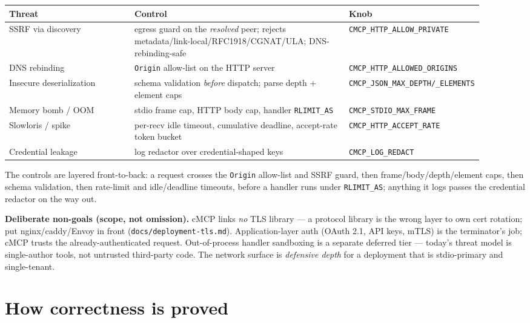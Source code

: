 \documentclass[10pt]{article}
\newcommand{\code}[1]{\texttt{\small #1}}
\begin{document}
\begin{center}\small
\begin{tabular}{p{0.27\linewidth} p{0.46\linewidth} p{0.18\linewidth}}
\toprule
Threat & Control & Knob \\
\midrule
SSRF via discovery & egress guard on the \emph{resolved} peer; rejects
  metadata/link-local/RFC1918/CGNAT/ULA; DNS-rebinding-safe & \code{CMCP\_HTTP\_ALLOW\_PRIVATE} \\
DNS rebinding & \code{Origin} allow-list on the HTTP server & \code{CMCP\_HTTP\_ALLOWED\_ORIGINS} \\
Insecure deserialization & schema validation \emph{before} dispatch; parse depth + element caps & \code{CMCP\_JSON\_MAX\_DEPTH/\_ELEMENTS} \\
Memory bomb / OOM & stdio frame cap, HTTP body cap, handler \code{RLIMIT\_AS} & \code{CMCP\_STDIO\_MAX\_FRAME} \\
Slowloris / spike & per-recv idle timeout, cumulative deadline, accept-rate token bucket & \code{CMCP\_HTTP\_ACCEPT\_RATE} \\
Credential leakage & log redactor over credential-shaped keys & \code{CMCP\_LOG\_REDACT} \\
\bottomrule
\end{tabular}
\end{center}

The controls are layered front-to-back: a request crosses the \code{Origin}
allow-list and SSRF guard, then frame/body/depth/element caps, then schema
validation, then rate-limit and idle/deadline timeouts, before a handler runs
under \code{RLIMIT\_AS}; anything it logs passes the credential redactor on the
way out.

\textbf{Deliberate non-goals (scope, not omission).} cMCP links \emph{no} TLS
library --- a protocol library is the wrong layer to own cert rotation; put
nginx/caddy/Envoy in front (\code{docs/deployment-tls.md}). Application-layer auth
(OAuth 2.1, API keys, mTLS) is the terminator's job; cMCP trusts the
already-authenticated request. Out-of-process handler sandboxing is a separate
deferred tier --- today's threat model is single-author tools, not untrusted
third-party code. The network surface is \emph{defensive depth} for a deployment
that is stdio-primary and single-tenant.

\section{How correctness is proved}
\end{document}
